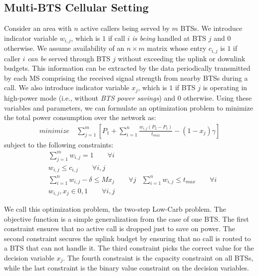 \subsection{Multi-BTS Cellular Setting}
Consider an area with $n$ active callers being served by $m$ BTSs.
We introduce indicator variable $w_{i,j}$, which is $1$ if call
$i$ \textit{is being} handled at BTS $j$ and $0$ otherwise. We
assume availability of an $n\times m$ matrix whose entry
$c_{i,j}$ is $1$ if caller $i$ \textit{can be} served through
BTS $j$ without exceeding the uplink or downlink budgets.
This information can be extracted by the data periodically
transmitted by each MS comprising the received signal strength
from nearby BTSs during a call. We also introduce indicator
variable $x_j$, which is $1$ if BTS $j$ is operating in
high-power mode (i.e., without \textit{BTS power savings}) and
$0$ otherwise. Using these variables and parameters, we can
formulate an optimization problem to minimize the total power
consumption over the network as:
\begin{align}
\textit{minimize} \quad \sum_{j=1}^{m} \left[
P_1+\sum_{i=1}^{n}\frac{w_{i,j}(P_2-P_1)}{t_{max}}-(1-x_j)\gamma
\right]
\end{align}
subject to the following constraints:
\begin{align}
& \sum_{j=1}^m w_{i,j} = 1 \qquad \forall i \\
& w_{i,j} \leq c_{i,j} \qquad \forall i, j \\
& \sum_{i=1}^nw_{i,j}-\delta \leq Mx_j \qquad \forall j%
& \sum_{i=1}^n w_{i,j} \le t_{max} \qquad \forall i \\
& w_{i,j}, x_j \in {0,1} \qquad \forall i, j%
\end{align}

We call this optimization problem, the two-step Low-Carb problem. The objective function is a simple generalization from the case
of one BTS. The first constraint ensures that no active call is
dropped just to save on power. The second constraint secures
the uplink budget by ensuring that no call is routed to a BTS
that can not handle it. The third constraint picks the correct
value for the decision variable $x_j$. The fourth constraint is the capacity constraint on all BTSs, while the last
constraint is the binary value constraint on the decision
variables.

